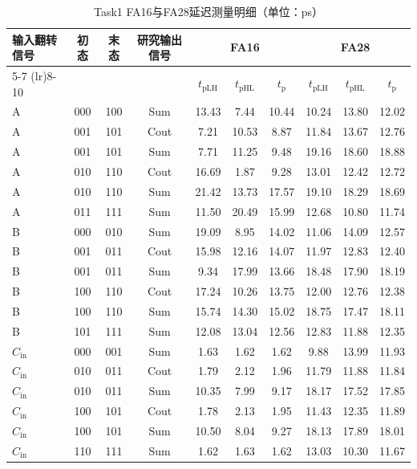 \documentclass[UTF8,12pt,a4paper]{ctexart}
\begin{document}
\begin{table}[htbp]
    \centering
    \caption{Task1 FA16与FA28延迟测量明细（单位：ps）}
    \label{tab:task1_delay_detail}
    \footnotesize
    \begin{tabular}{lccccccccc}
    \toprule
    \multirow{2}{*}{输入翻转信号} & \multirow{2}{*}{初态} & \multirow{2}{*}{末态} & \multirow{2}{*}{研究输出信号} & \multicolumn{3}{c}{FA16} & \multicolumn{3}{c}{FA28} \\
    \cmidrule(lr){5-7} \cmidrule(lr){8-10}
     &  &  &  & $t_{\text{pLH}}$ & $t_{\text{pHL}}$ & $t_{\text{p}}$ & $t_{\text{pLH}}$ & $t_{\text{pHL}}$ & $t_{\text{p}}$ \\
    \midrule
    A & 000 & 100 & Sum & 13.43 & 7.44 & 10.44 & 10.24 & 13.80 & 12.02 \\
    A & 001 & 101 & Cout & 7.21 & 10.53 & 8.87 & 11.84 & 13.67 & 12.76 \\
    A & 001 & 101 & Sum & 7.71 & 11.25 & 9.48 & 19.16 & 18.60 & 18.88 \\
    A & 010 & 110 & Cout & 16.69 & 1.87 & 9.28 & 13.01 & 12.42 & 12.72 \\
    A & 010 & 110 & Sum & 21.42 & 13.73 & 17.57 & 19.10 & 18.29 & 18.69 \\
    A & 011 & 111 & Sum & 11.50 & 20.49 & 15.99 & 12.68 & 10.80 & 11.74 \\
    B & 000 & 010 & Sum & 19.09 & 8.95 & 14.02 & 11.06 & 14.09 & 12.57 \\
    B & 001 & 011 & Cout & 15.98 & 12.16 & 14.07 & 11.97 & 12.83 & 12.40 \\
    B & 001 & 011 & Sum & 9.34 & 17.99 & 13.66 & 18.48 & 17.90 & 18.19 \\
    B & 100 & 110 & Cout & 17.24 & 10.26 & 13.75 & 12.00 & 12.76 & 12.38 \\
    B & 100 & 110 & Sum & 15.74 & 14.30 & 15.02 & 18.75 & 17.47 & 18.11 \\
    B & 101 & 111 & Sum & 12.08 & 13.04 & 12.56 & 12.83 & 11.88 & 12.35 \\
    $C_{\text{in}}$ & 000 & 001 & Sum & 1.63 & 1.62 & 1.62 & 9.88 & 13.99 & 11.93 \\
    $C_{\text{in}}$ & 010 & 011 & Cout & 1.79 & 2.12 & 1.96 & 11.79 & 11.88 & 11.84 \\
    $C_{\text{in}}$ & 010 & 011 & Sum & 10.35 & 7.99 & 9.17 & 18.17 & 17.52 & 17.85 \\
    $C_{\text{in}}$ & 100 & 101 & Cout & 1.78 & 2.13 & 1.95 & 11.43 & 12.35 & 11.89 \\
    $C_{\text{in}}$ & 100 & 101 & Sum & 10.50 & 8.04 & 9.27 & 18.13 & 17.89 & 18.01 \\
    $C_{\text{in}}$ & 110 & 111 & Sum & 1.62 & 1.63 & 1.62 & 13.03 & 10.30 & 11.67 \\
    \bottomrule
    \end{tabular}
\end{table}
\end{document}
